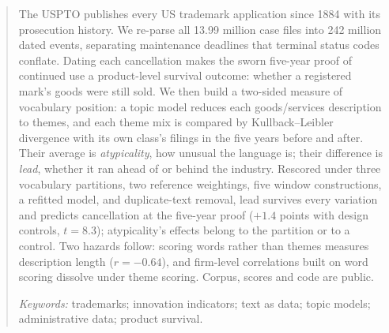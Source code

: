 \begin{abstract}
\noindent The USPTO publishes every US trademark application since 1884
with its prosecution history. We re-parse all 13.99 million case files
into 242 million dated events, separating maintenance deadlines that
terminal status codes conflate. Dating each cancellation makes the sworn
five-year proof of continued use a product-level survival outcome:
whether a registered mark's goods were still sold. We
then build a two-sided measure of vocabulary position: a topic
model reduces each goods/services description to themes, and each theme mix is
compared by Kullback--Leibler divergence with its own class's filings
in the five years before and after.
Their average is \emph{atypicality}, how unusual the language is; their
difference is \emph{lead}, whether it ran ahead of or behind the
industry. Rescored under three vocabulary partitions, two reference
weightings, five window constructions, a refitted model, and
duplicate-text removal, lead survives every variation and predicts
cancellation at the five-year proof ($+1.4$ points with design
controls, $t = 8.3$); atypicality's effects belong to the partition or
to a control. Two hazards follow: scoring words rather than themes
measures description length ($r = -0.64$), and firm-level correlations
built on word scoring dissolve under theme scoring. Corpus, scores and
code are public.

\medskip
\noindent\emph{Keywords:} trademarks; innovation indicators; text as
data; topic models; administrative data; product survival.
\end{abstract}

